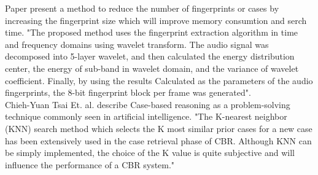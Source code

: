 Paper\cite{6497946} present a method to reduce the number of fingerprints or cases by increasing the fingerprint size which will improve memory consumtion and serch time.
"The proposed method uses the fingerprint extraction algorithm in time and frequency domains using wavelet transform. The audio signal was decomposed into 5-layer wavelet, and then calculated the energy distribution center, the energy of sub-band in wavelet domain, and the variance of wavelet coefficient. Finally, by using the results Calculated as the parameters of the audio fingerprints, the 8-bit fingerprint block per frame was generated"\cite{6497946}.\\


Chieh-Yuan Tsai Et. al. describe Case-based reasoning as a problem-solving technique
commonly seen in artificial intelligence\cite{5169353}. "The K-nearest neighbor (KNN) search
method which selects the K most similar prior cases for a new
case has been extensively used in the case retrieval phase of
CBR. Although KNN can be simply implemented, the choice of
the K value is quite subjective and will influence the
performance of a CBR system."
